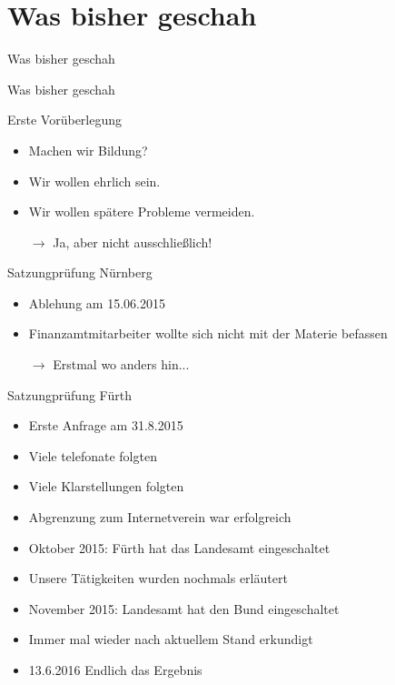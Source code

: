 \section*{Was bisher geschah}
\begin{frame}{Was bisher geschah}
    \begin{center}
        Was bisher geschah
    \end{center}
\end{frame}

\begin{frame}{Erste Vorüberlegung}
    \begin{itemize}
        \item Machen wir Bildung?
        \item Wir wollen ehrlich sein.
        \item Wir wollen spätere Probleme vermeiden.
        \item[$\rightarrow$] Ja, aber nicht ausschließlich!
    \end{itemize}
\end{frame}

\begin{frame}{Satzungprüfung Nürnberg}
    \begin{itemize}
        \item Ablehung am 15.06.2015
        \item Finanzamtmitarbeiter wollte sich nicht mit der Materie befassen
        \item[$\rightarrow$] Erstmal wo anders hin...
    \end{itemize}
\end{frame}

\begin{frame}{Satzungprüfung Fürth}
    \begin{itemize}
        \item Erste Anfrage am 31.8.2015
        \item Viele telefonate folgten
        \item Viele Klarstellungen folgten
        \item Abgrenzung zum Internetverein war erfolgreich
        \item Oktober 2015: Fürth hat das Landesamt eingeschaltet
        \item Unsere Tätigkeiten wurden nochmals erläutert
        \item November 2015: Landesamt hat den Bund eingeschaltet
        \item Immer mal wieder nach aktuellem Stand erkundigt
        \item 13.6.2016 Endlich das Ergebnis
    \end{itemize}
\end{frame}

